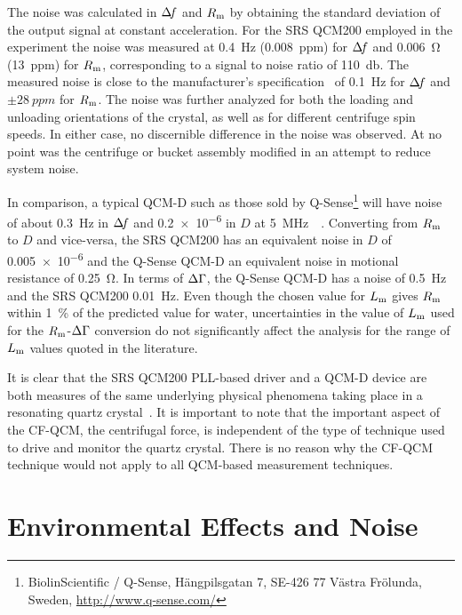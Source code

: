 The noise was calculated in $\Delta\!f$ and $R_\mathrm{m}$ by obtaining the standard
deviation of the output signal at constant acceleration.  For the SRS
QCM200 employed in the experiment the noise was measured at
\SI{0.4}{\hertz} (\SI{0.008}{ppm}) for $\Delta\!f$ and \SI{0.006}{\ohm}
(\SI{13}{ppm}) for $R_\mathrm{m}$, corresponding to a signal to noise ratio of
\SI{110}{\decibel}.  The measured noise is close to the manufacturer's
specification~\cite{srsqcm200manual} of \SI{0.1}{\hertz} for $\Delta\!f$ and
$\pm\SI{28}{ppm}$ for $R_\mathrm{m}$.  The noise was further analyzed for both the
loading and unloading orientations of the crystal, as well as for different
centrifuge spin speeds.  In either case, no discernible difference in the
noise was observed.  At no point was the centrifuge or bucket assembly
modified in an attempt to reduce system noise.

In comparison, a typical QCM-D such as those sold by
Q-Sense\footnote{BiolinScientific / Q-Sense, Hängpilsgatan 7, SE-426 77
Västra Frölunda, Sweden,  \url{http://www.q-sense.com/}} will have noise of
about \SI{0.3}{\hertz} in $\Delta\!f$ and \num{0.2e-6} in $D$ at
\SI{5}{\mega\hertz}~\cite{su2005comparison}~\cite{peh2007understanding}.
Converting from $R_\mathrm{m}$ to $D$ and vice-versa, the SRS QCM200 has an
equivalent noise in $D$ of \num{0.005e-6} and the Q-Sense QCM-D an
equivalent noise in motional resistance of \SI{0.25}{\ohm}.  In terms of
$\Delta\Gamma$, the Q-Sense QCM-D has a noise of \SI{0.5}{\hertz} and the SRS QCM200
\SI{0.01}{\hertz}.  Even though the chosen value for $L_\mathrm{m}$ gives $R_\mathrm{m}$
within \SI{1}{\percent} of the predicted value for water, uncertainties in
the value of $L_\mathrm{m}$ used for the $R_\mathrm{m}$-$\Delta\Gamma$ conversion do not significantly
affect the analysis for the range of $L_\mathrm{m}$ values quoted in the literature.

It is clear that the SRS QCM200 PLL-based driver and a QCM-D device are
both measures of the same underlying physical phenomena taking place in a
resonating quartz crystal~\cite{geelhood2002transient}.  It is important to
note that the important aspect of the CF-QCM, the centrifugal force, is
independent of the type of technique used to drive and monitor the quartz
crystal.  There is no reason why the CF-QCM technique would not apply to
all QCM-based measurement techniques.

\section{Environmental Effects and Noise}


